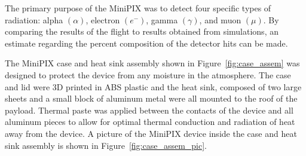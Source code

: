 The primary purpose of the MiniPIX was to detect four specific types of radiation: alpha $(\alpha)$, electron $({e^-})$, gamma $({\gamma})$, and muon $({\mu})$. By comparing the results of the flight to results obtained from simulations, an estimate regarding the percent composition of the detector hits can be made.

The MiniPIX case and heat sink assembly shown in Figure~\ref{fig:case_assem} was designed to protect the device from any moisture in the atmosphere. The case and lid were 3D printed in ABS plastic and the heat sink, composed of two large sheets and a small block of aluminum metal were all mounted to the roof of the payload. Thermal paste was applied between the contacts of the device and all aluminum pieces to allow for optimal thermal conduction and radiation of heat away from the device. A picture of the MiniPIX device inside the case and heat sink assembly is shown in Figure~\ref{fig:case_assem_pic}.



